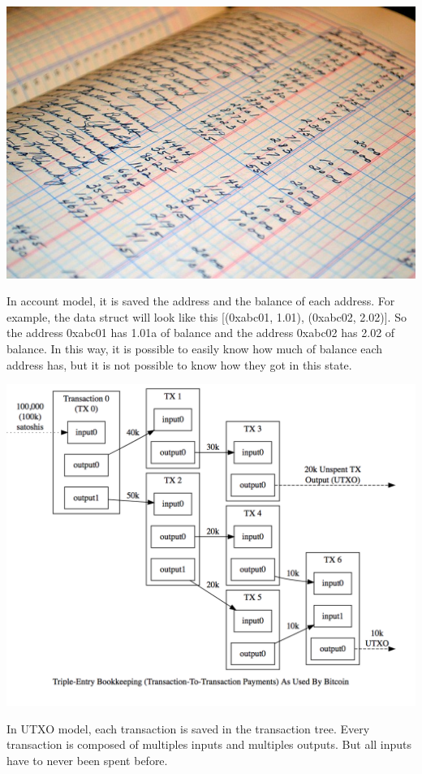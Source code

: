 \documentclass[12pt]{article}
\begin{document}
  \includegraphics[width=\columnwidth]{imgs/account.jpeg}

In account model, it is saved the address and the balance of each address.
For example, the data struct will look like this [(0xabc01, 1.01), (0xabc02, 2.02)].
So the address 0xabc01 has 1.01a of balance and the address 0xabc02 has 2.02 of balance.
In this way, it is possible to easily know how much of balance each address has,
but it is not possible to know how they got in this state.

  \includegraphics[width=\columnwidth]{imgs/utxo.png}

In UTXO model, each transaction is saved in the transaction tree.
Every transaction is composed of multiples inputs and multiples outputs.
But all inputs have to never been spent before.
\end{document}
